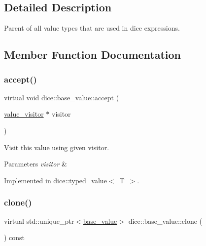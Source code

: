 \subsection{Detailed Description}
Parent of all value types that are used in dice expressions. 

\subsection{Member Function Documentation}
\mbox{\label{classdice_1_1base__value_a8ab0acd9a7b10035a1c8f8a0f05b40b4}} 
\subsubsection{\texorpdfstring{accept()}{accept()}}
{\footnotesize\ttfamily virtual void dice\+::base\+\_\+value\+::accept (\begin{DoxyParamCaption}\item[{\mbox{\hyperlink{classdice_1_1value__visitor}{value\+\_\+visitor}} $\ast$}]{visitor }\end{DoxyParamCaption})\hspace{0.3cm}{\ttfamily [pure virtual]}}



Visit this value using given visitor. 


\begin{DoxyParams}{Parameters}
{\em visitor} & \\
\hline
\end{DoxyParams}


Implemented in \mbox{\hyperlink{classdice_1_1typed__value_ae9563902b664c40a4b3d8a8cb201a194}{dice\+::typed\+\_\+value$<$ T $>$}}.

\mbox{\label{classdice_1_1base__value_a58335a522dda6d97332f938ead90aa15}} 
\subsubsection{\texorpdfstring{clone()}{clone()}}
{\footnotesize\ttfamily virtual std\+::unique\+\_\+ptr$<$\mbox{\hyperlink{classdice_1_1base__value}{base\+\_\+value}}$>$ dice\+::base\+\_\+value\+::clone (\begin{DoxyParamCaption}{ }\end{DoxyParamCaption}) const\hspace{0.3cm}{\ttfamily [pure virtual]}}



